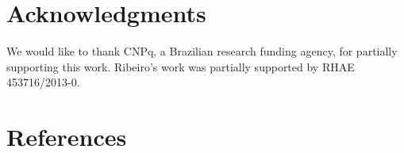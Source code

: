 \documentclass[review]{elsarticle}
\begin{document}
\linenumbers













\section*{Acknowledgments}

We would like to thank CNPq, a Brazilian research funding agency, for partially supporting this work. Ribeiro's work was partially supported by RHAE 453716/2013-0.

\section{References}


\end{document}
